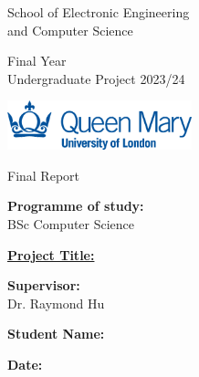\setlength{\columnsep}{1cm}
\setlength{\columnseprule}{1pt}
\begin{titlepage}
    \begin{multicols*}{2}

        \noindent
        School of Electronic Engineering
        \\and Computer Science

        \vfill

        \noindent
        Final Year
        \\Undergraduate Project 2023/24

        \vspace{1cm}
        \noindent
        \includegraphics[width=0.4\textwidth]{QM.png}

        \columnbreak

        \noindent
        Final Report

        \vfill

        \noindent
        \textbf{Programme of study:}
        \\BSc Computer Science

        \vfill
        \noindent
        \underline{\textbf{Project Title:}}
        \large
        \\\textbf{\@title}

        \normalsize
        \vfill
        \noindent
        \textbf{Supervisor:}
        \\Dr. Raymond Hu

        \vfill
        \noindent
        \textbf{Student Name:}
        \\\@author

        \vspace{0pt plus 2fill}

        \noindent
        \textbf{Date:} \@date

    \end{multicols*}
\end{titlepage}
